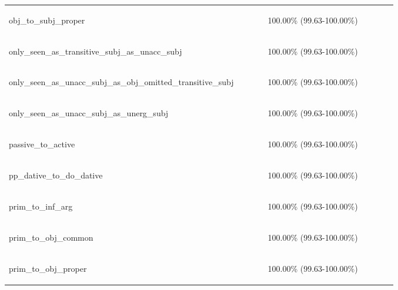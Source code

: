 \documentclass[11pt]{article}
\begin{document}
\begin{table}
\begin{tabular}{p{0.6\linewidth} p{0.3\linewidth}}
\begin{tiny}obj\_to\_subj\_proper\end{tiny} & \begin{tiny} 100.00\% (99.63-100.00\%)\end{tiny} \\
\begin{tiny}only\_seen\_as\_transitive\_subj\_as\_unacc\_subj\end{tiny} & \begin{tiny} 100.00\% (99.63-100.00\%)\end{tiny} \\
\begin{tiny}only\_seen\_as\_unacc\_subj\_as\_obj\_omitted\_transitive\_subj\end{tiny} & \begin{tiny} 100.00\% (99.63-100.00\%)\end{tiny} \\
\begin{tiny}only\_seen\_as\_unacc\_subj\_as\_unerg\_subj\end{tiny} & \begin{tiny} 100.00\% (99.63-100.00\%)\end{tiny} \\
\begin{tiny}passive\_to\_active\end{tiny} & \begin{tiny} 100.00\% (99.63-100.00\%)\end{tiny} \\
\begin{tiny}pp\_dative\_to\_do\_dative\end{tiny} & \begin{tiny} 100.00\% (99.63-100.00\%)\end{tiny} \\
\begin{tiny}prim\_to\_inf\_arg\end{tiny} & \begin{tiny} 100.00\% (99.63-100.00\%)\end{tiny} \\
\begin{tiny}prim\_to\_obj\_common\end{tiny} & \begin{tiny} 100.00\% (99.63-100.00\%)\end{tiny} \\
\begin{tiny}prim\_to\_obj\_proper\end{tiny} & \begin{tiny} 100.00\% (99.63-100.00\%)\end{tiny} \\

\end{tabular}
\end{table}
\end{document}
